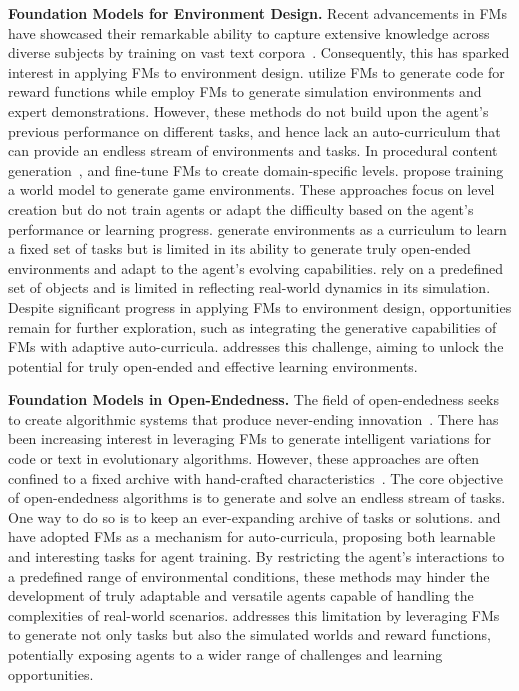 \documentclass{article} %
\begin{document}
\textbf{Foundation Models for Environment Design.}
%
Recent advancements in FMs have showcased their remarkable ability to capture extensive knowledge across diverse subjects by training on vast text corpora~\citep{bommasani2021opportunities}. Consequently, this has sparked interest in applying FMs to environment design. \citet{ma_EurekaHumanLevelReward_2023} utilize FMs to generate code for reward functions while \citet{wang_GenSimGeneratingRobotic_2023} employ FMs to generate simulation environments and expert demonstrations. However, these methods do not build upon the agent's previous performance on different tasks, and hence lack an auto-curriculum that can provide an endless stream of environments and tasks. In procedural content generation~\citep{shaker2016procedural, juliani2019obstacle, justesen2018illuminating}, \citet{sudhakaran_MarioGPTOpenEndedText2Level_2023} and \citet{todd_LevelGenerationLarge_2023} fine-tune FMs to create domain-specific levels. \citet{bruce_GenieGenerativeInteractive_2024} propose training a world model to generate game environments. These approaches focus on level creation but do not train agents or adapt the difficulty based on the agent's performance or learning progress. \citet{zala_EnvGenGeneratingAdapting_2024} generate environments as a curriculum to learn a fixed set of tasks but is limited in its ability to generate truly open-ended environments and adapt to the agent's evolving capabilities. \citet{wang_RoboGenUnleashingInfinite_2023} rely on a predefined set of objects and is limited in reflecting real-world dynamics in its simulation.
Despite significant progress in applying FMs to environment design, opportunities remain for further exploration, such as integrating the generative capabilities of FMs with adaptive auto-curricula. \ours{} addresses this challenge, aiming to unlock the potential for truly open-ended and effective learning environments.

\textbf{Foundation Models in Open-Endedness.}
%
The field of open-endedness seeks to create algorithmic systems that produce never-ending innovation~\citep{stanley2017open}. There has been increasing interest in leveraging FMs to generate intelligent variations for code or text in evolutionary algorithms. However, these approaches are often confined to a fixed archive with hand-crafted characteristics~\citep{bradley2023quality,ding2023quality, lehman_EvolutionLargeModels_2024,lim2024large}. The core objective of open-endedness algorithms is to generate and solve an endless stream of tasks. One way to do so is to keep an ever-expanding archive of tasks or solutions. \citet{zhang_OMNIOpenendednessModels_2023} and \citet{wang2023voyager} have adopted FMs as a mechanism for auto-curricula, proposing both learnable and interesting tasks for agent training. By restricting the agent's interactions to a predefined range of environmental conditions, these methods may hinder the development of truly adaptable and versatile agents capable of handling the complexities of real-world scenarios. \ours{} addresses this limitation by leveraging FMs to generate not only tasks but also the simulated worlds and reward functions, potentially exposing agents to a wider range of challenges and learning opportunities.
\end{document}
